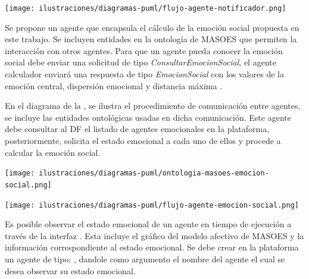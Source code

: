 \begin{ilustracion}[fuente=\yo, etiqueta=flujo-agente-notificador, titulo={Comunicación con el Agente Notificador}]
\texttt{[image: ilustraciones/diagramas-puml/flujo-agente-notificador.png]}
\end{ilustracion}


\label{agente-calculador-emocion-social}

Se propone un agente
que encapsula el cálculo de la emoción social
propuesta en este trabajo. Se incluyen entidades en la ontología de MASOES que permiten
la interacción con otros agentes.
Para que un agente pueda conocer la emoción social
debe enviar una solicitud de tipo \textit{ConsultarEmocionSocial},
el agente calculador enviará una respuesta de tipo \textit{EmocionSocial}
con los valores de la emoción central, dispersión emocional
y distancia máxima .

En el diagrama de la , se ilustra el procedimiento
de comunicación entre agentes, se incluye las entidades ontológicas usadas en dicha comunicación.
Este agente debe consultar al DF el listado de agentes emocionales en la plataforma,
posteriormente, solicita el estado emocional a cada uno de ellos y procede a calcular la emoción
social.

\begin{ilustracion}[fuente=\yo, etiqueta=ontologia-masoes-emocion-social, titulo={Ontología para MASOES, Acción Consultar Emoción Social}]
\texttt{[image: ilustraciones/diagramas-puml/ontologia-masoes-emocion-social.png]}
\end{ilustracion}

\begin{ilustracion}[fuente=\yo, etiqueta=flujo-agente-emocion-social, titulo={Comunicación con el Agente Calculador de Emoción Social}]
\texttt{[image: ilustraciones/diagramas-puml/flujo-agente-emocion-social.png]}
\end{ilustracion}


Es posible observar el estado emocional de un agente en tiempo de ejecución a través de la interfaz
 .
Esta incluye el gráfico del modelo afectivo de MASOES y la información correspondiente al estado emocional.
Se debe crear en la plataforma un agente de tipo: ,
dandole como argumento el
nombre del agente el cual se desea observar su estado emocional.

